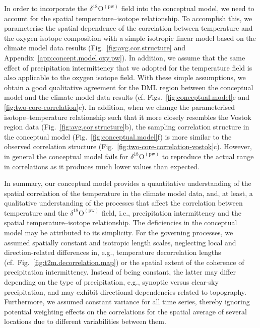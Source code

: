 \documentclass[cp, manuscript]{copernicus}
\begin{document}
In order to incorporate the $\delta^{18}\mathrm{O}^{\mathrm{(pw)}}$ field into
the conceptual model, we need to account for the spatial temperature--isotope
relationship. To accomplish this, we parameterise the spatial dependence of the
correlation between temperature and the oxygen isotope composition with a simple
isotropic linear model based on the climate model data results
(Fig.~\ref{fig:avg.cor.structure} and
Appendix~\ref{app:concept.model.oxy.pw}). In addition, we assume that the same
effect of precipitation intermittency that we adopted for the temperature field
is also applicable to the oxygen isotope field. With these simple assumptions,
we obtain a good qualitative agreement for the DML region between the conceptual
model and the climate model data results (cf. Figs.~\ref{fig:conceptual.model}c
and \ref{fig:two-core-correlation}c). In addition, when we change the
parameterised isotope--temperature relationship such that it more closely
resembles the Vostok region data (Fig.~\ref{fig:avg.cor.structure}b), the
sampling correlation structure in the conceptual model
(Fig.~\ref{fig:conceptual.model}f) is more similar to the observed correlation
structure (Fig.~\ref{fig:two-core-correlation-vostok}c). However, in general the
conceptual model fails for $\delta^{18}\mathrm{O}^{\mathrm{(pw)}}$ to reproduce
the actual range in correlations as it produces much lower values than expected.

In summary, our conceptual model provides a quantitative understanding of the
spatial correlation of the temperature in the climate model data, and, at least,
a qualitative understanding of the processes that affect the correlation between
temperature and the $\delta^{18}\mathrm{O}^{\mathrm{(pw)}}$ field, i.e.,
precipitation intermittency and the spatial temperature--isotope
relationship. The deficiencies in the conceptual model may be attributed to its
simplicity. For the governing processes, we assumed spatially constant and
isotropic length scales, neglecting local and direction-related differences in,
e.g., temperature decorrelation lengths
(cf.~Fig.~\ref{fig:t2m.decorrelation.map}) or the spatial extent of the
coherence of precipitation intermittency. Instead of being constant, the latter
may differ depending on the type of precipitation, e.g., synoptic versus
clear-sky precipitation, and may exhibit directional dependencies related to
topography. Furthermore, we assumed constant variance for all time series,
thereby ignoring potential weighting effects on the correlations for the spatial
average of several locations due to different variabilities between them.
\end{document}
